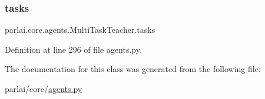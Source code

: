 \subsubsection{\texorpdfstring{tasks}{tasks}}
{\footnotesize\ttfamily parlai.\+core.\+agents.\+Multi\+Task\+Teacher.\+tasks}



Definition at line 296 of file agents.\+py.



The documentation for this class was generated from the following file\+:\begin{DoxyCompactItemize}
\item 
parlai/core/\hyperlink{parlai_2core_2agents_8py}{agents.\+py}\end{DoxyCompactItemize}
